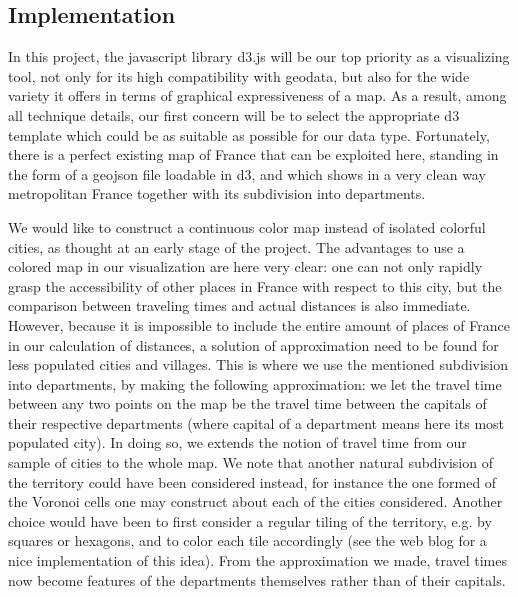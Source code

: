 \documentclass{vgtc}                          %
\begin{document}
\subsection{Implementation}

\vspace{0.2cm}


In this project, the javascript library d3.js will be our top priority as a visualizing tool, not only for its high compatibility with geodata, but also for the wide variety it offers in terms of graphical expressiveness of a map. As a result, among all technique details, our first concern will be to select the appropriate d3 template which could be as suitable as possible for our data type. Fortunately, there is a perfect existing 
 map of France that can be exploited here, standing in the form of a geojson file loadable in d3, and which shows in a very clean way metropolitan France together with its subdivision into departments. 
 
 



We would like to construct a continuous color map instead of isolated colorful cities, as thought at an early stage of the project. The advantages to use a colored map in our visualization are here very clear: one can not only rapidly grasp the accessibility of other places in France with respect to this city, but the comparison between traveling times and actual distances is also immediate. However, because it is impossible to include the entire amount of places of France in our calculation of distances, a solution of approximation need to be found for less populated cities and villages. This is where we use the mentioned subdivision into departments, by making the following approximation: we let the travel time between any two points on the map be the travel time between the capitals of their respective departments (where capital of a department means here its most populated city). In doing so, we extends the notion of travel time from our sample of cities to the whole map. We note that another natural subdivision of the territory could have been considered instead, for instance the one formed of the Voronoi cells one may construct about each of the cities considered. Another choice would have been to first consider a regular tiling of the territory, e.g. by squares or hexagons, and to color each tile accordingly (see the web blog \cite{smith} for a nice implementation of this idea). From the approximation we made, travel times now become features of the departments themselves rather than of their capitals.
\end{document}
